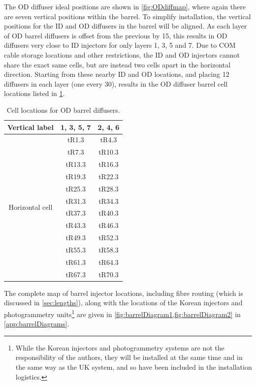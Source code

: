 \documentclass[a4paper,11pt]{article}
\begin{document}
The OD diffuser ideal positions are shown in \cref{fig:ODdiffmap}, where again there are seven vertical positions within the barrel. To simplify installation, the vertical positions for the ID and OD diffusers in the barrel will be aligned. As each layer of OD barrel diffusers is offset from the previous by 15\degree , this results in OD diffusers very close to ID injectors for only layers 1, 3, 5 and 7. Due to COM cable storage locations and other restrictions, the ID and OD injectors cannot share the exact same cells, but are instead two cells apart in the horizontal direction. Starting from these nearby ID and OD locations, and placing 12 diffusers in each layer (one every 30\degree), results in the OD diffuser barrel cell locations listed in \cref{tab:ODdiffBarrel}.
\begin{table}[h!]
\centering
\begin{tabular}{c|cc} \toprule
Vertical label 			& 1, 3, 5, 7 & 2, 4, 6 \\ \midrule
\multirow{12}{*}{Horizontal cell}	&	tR1.3	&	tR4.3 	\\
						&	tR7.3	&	tR10.3	\\
						&	tR13.3	&	tR16.3	\\
						&	tR19.3	&	tR22.3	\\
						&	tR25.3	&	tR28.3	\\
						&	tR31.3	&	tR34.3	\\
						&	tR37.3	&	tR40.3	\\
						&	tR43.3	&	tR46.3	\\
						&	tR49.3	&	tR52.3	\\
						&	tR55.3	&	tR58.3	\\
						&	tR61.3	&	tR64.3	\\
						&	tR67.3	&	tR70.3	\\ \bottomrule
\end{tabular}
\caption{Cell locations for OD barrel diffusers.}\label{tab:ODdiffBarrel}
\end{table}

The complete map of barrel injector locations, including fibre routing (which is discussed in \cref{sec:lengths}), along with the locations of the Korean injectors and photogrammetry units\footnote{While the Korean injectors and photogrammetry systems are not the responsibility of the authors, they will be installed at the same time and in the same way as the UK system, and so have been included in the installation logistics.} are given in \cref{fig:barrelDiagram1,fig:barrelDiagram2} in \cref{app:barrelDiagrams}.
\end{document}
